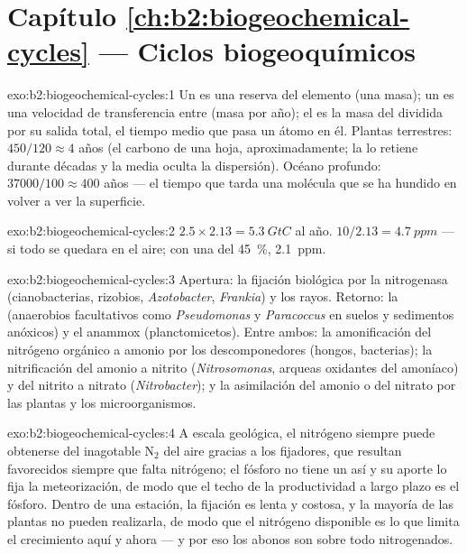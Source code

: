 \section*{Capítulo \ref{ch:b2:biogeochemical-cycles} --- Ciclos biogeoquímicos}

\begin{solution}{exo:b2:biogeochemical-cycles:1}
Un  es una reserva del elemento (una masa); un  es una
velocidad de transferencia entre  (masa por año); el  es la masa del  dividida por su salida total, el
tiempo medio que pasa un átomo en él. Plantas terrestres: $450/120 \approx 4$
años (el carbono de una hoja, aproximadamente; la  lo retiene
durante décadas y la media oculta la dispersión). Océano profundo:
$37000/100 \approx 400$ años --- el tiempo que tarda una molécula que se ha
hundido en volver a ver la superficie.
\end{solution}

\begin{solution}{exo:b2:biogeochemical-cycles:2}
$2.5\times 2.13 = \qty{5.3}{GtC}$ al año. $10/2.13 = \qty{4.7}{ppm}$
--- si todo se quedara en el aire; con una  del
\qty{45}{\%}, \qty{2.1}{ppm}.
\end{solution}

\begin{solution}{exo:b2:biogeochemical-cycles:3}
Apertura: la fijación biológica por la nitrogenasa (cianobacterias,
rizobios, \emph{Azotobacter}, \emph{Frankia}) y los rayos. Retorno: la
 (anaerobios facultativos como \emph{Pseudomonas}
y \emph{Paracoccus} en suelos y sedimentos anóxicos) y el anammox
(planctomicetos). Entre ambos: la amonificación del nitrógeno orgánico a
amonio por los descomponedores (hongos, bacterias); la nitrificación del
amonio a nitrito (\emph{Nitrosomonas}, arqueas oxidantes del amoníaco) y
del nitrito a nitrato (\emph{Nitrobacter}); y la asimilación del amonio o
del nitrato por las plantas y los microorganismos.
\end{solution}

\begin{solution}{exo:b2:biogeochemical-cycles:4}
A escala geológica, el nitrógeno siempre puede obtenerse del inagotable
$\mathrm{N_2}$ del aire gracias a los fijadores, que resultan favorecidos
siempre que falta nitrógeno; el fósforo no tiene un  así y su
aporte lo fija la meteorización, de modo que el techo de la productividad
a largo plazo es el fósforo. Dentro de una estación, la fijación es lenta
y costosa, y la mayoría de las plantas no pueden realizarla, de modo que
el nitrógeno disponible es lo que limita el crecimiento aquí y ahora ---
y por eso los abonos son sobre todo nitrogenados.
\end{solution}

